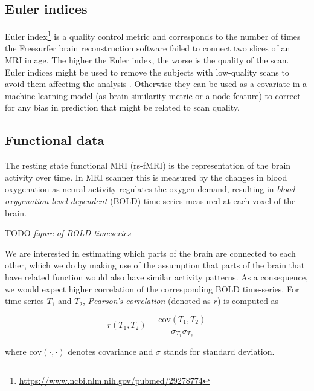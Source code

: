 \subsection{Euler indices}
Euler index\footnote{\url{https://www.ncbi.nlm.nih.gov/pubmed/29278774}} is a quality control metric and corresponds to the number of times the Freesurfer brain reconstruction software failed to connect two slices of an MRI image. The higher the Euler index, the worse is the quality of the scan. Euler indices might be used to remove the subjects with low-quality scans to avoid them affecting the analysis \cite{kaufmann2019}. Otherwise they can be used as a covariate in a machine learning model (as brain similarity metric or a node feature) to correct for any bias in prediction that might be related to scan quality.

\subsection{Functional data}
The resting state functional MRI (rs-fMRI) is the representation of the brain activity over time. In MRI scanner this is measured by the changes in blood oxygenation as neural activity regulates the oxygen demand, resulting in \textit{blood oxygenation level dependent} (BOLD) time-series measured at each voxel of the brain.

TODO \textit{figure of BOLD timeseries}

We are interested in estimating which parts of the brain are connected to each other, which we do by making use of the assumption that parts of the brain that have related function would also have similar activity patterns. As a consequence, we would expect higher correlation of the corresponding BOLD time-series. For time-series $T_1$ and $T_2$, \textit{Pearson's correlation} (denoted as $r$) is computed as

\begin{equation}
    r(T_1, T_2) = \frac{\mathrm{cov}(T_1, T_2)}{\sigma_{T_1} \sigma_{T_2}}
\end{equation}

where $\mathrm{cov}(\cdot, \cdot)$ denotes covariance and $\sigma$ stands for standard deviation.

